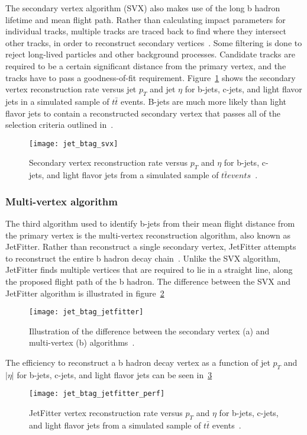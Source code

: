 The secondary vertex algorithm (SVX) also makes use of the long b hadron lifetime and mean flight path.
Rather than calculating impact parameters for individual tracks, multiple tracks are traced back to find where they
intersect other tracks, in order to reconstruct secondary vertices~\cite{jet-commissioning-b-tagging}.
Some filtering is done to reject long-lived particles and other background processes.
Candidate tracks are required to be a certain significant distance from the primary vertex, and the tracks have to pass a goodness-of-fit requirement.
Figure~\ref{fig:jet_btag_svx} shows the secondary vertex reconstruction rate versus jet $p_T$ and jet $\eta$ for b-jets, c-jets, and light flavor jets in a simulated sample of $t\bar{t}$ events.
B-jets are much more likely than light flavor jets to contain a reconstructed secondary vertex that passes all of the selection criteria outlined in~\cite{jet-bjet-opt}.

\begin{figure}[!ht]
    \centering
\texttt{[image: jet\_btag\_svx]}
\caption{Secondary vertex reconstruction rate versus $p_T$ and $\eta$ for b-jets, c-jets, and light flavor jets
from a simulated sample of $t\bar{t} events$~\cite{jet-bjet-opt}.}
\label{fig:jet_btag_svx}
\end{figure}

\subsubsection{Multi-vertex algorithm}\label{subsubsec:jet_btag_jetfitter}

The third algorithm used to identify b-jets from their mean flight distance from the primary vertex is the multi-vertex reconstruction algorithm, also known as JetFitter.
Rather than reconstruct a single secondary vertex, JetFitter attempts to reconstruct the entire b hadron decay chain~\cite{jet-btag-jetfitter}.
Unlike the SVX algorithm, JetFitter finds multiple vertices that are required to lie in a straight line, along the proposed flight path of the b hadron.
The difference between the SVX and JetFitter algorithm is illustrated in figure~\ref{fig:jet_btag_jetfitter}
\begin{figure}[!ht]
    \centering
\texttt{[image: jet\_btag\_jetfitter]}
\caption{Illustration of the difference between the secondary vertex (a) and multi-vertex (b) algorithms~\cite{jet-btag-jetfitter}.}
\label{fig:jet_btag_jetfitter}
\end{figure}
The efficiency to reconstruct a b hadron decay vertex as a function of jet $p_T$ and $|\eta|$ for b-jets, c-jets, and light flavor jets can be seen in~\ref{fig:jet_btag_jetfitter_perf}
\begin{figure}[!ht]
    \centering
\texttt{[image: jet\_btag\_jetfitter\_perf]}
\caption{JetFitter vertex reconstruction rate versus $p_T$ and $\eta$ for b-jets, c-jets, and light flavor jets from a simulated sample of $t\bar{t}$ events~\cite{jet-btag-mv2}.}
\label{fig:jet_btag_jetfitter_perf}
\end{figure}

